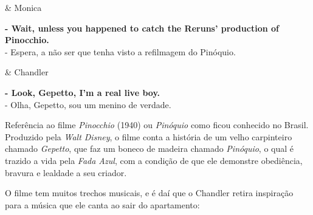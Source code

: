 \begin{tcolorbox}[enhanced,center upper,
    drop fuzzy shadow southeast, boxrule=0.3pt,
    lower separated=false,
    colframe=black!30!dialogoBorder,colback=white]
\begin{minipage}[c]{0.14\linewidth}
   & \centering \scriptsize{Monica}
\end{minipage}
\hspace{.1mm}
\begin{minipage}[c]{0.8\linewidth}
  \textbf{- Wait, unless you happened to catch the Reruns' production of Pinocchio.}\\
  - Espera, a não ser que tenha visto a refilmagem do Pinóquio.
\end{minipage}

\medskip
\begin{minipage}[c]{0.14\linewidth}
   & \centering \scriptsize{Chandler}
\end{minipage}
\hspace{.1mm}
\begin{minipage}[c]{0.8\linewidth}
  \textbf{- Look, Gepetto, I'm a real live boy.}\\
  - Olha, Gepetto, sou um menino de verdade.
\end{minipage}
\end{tcolorbox}

Referência ao filme \emph{Pinocchio} (1940) ou \emph{Pinóquio} como
ficou conhecido no Brasil. Produzido pela \emph{Walt Disney}, o filme
conta a história de um velho carpinteiro chamado \emph{Gepetto}, que faz
um boneco de madeira chamado \emph{Pinóquio}, o qual é trazido a vida
pela \emph{Fada Azul}, com a condição de que ele demonstre obediência,
bravura e lealdade a seu criador.

O filme tem muitos trechos musicais, e é daí que o Chandler retira
inspiração para a música que ele canta ao sair do apartamento:

